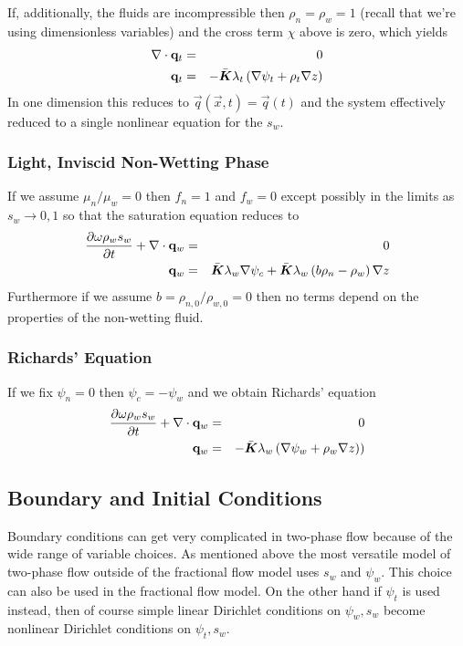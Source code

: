 \documentclass[10pt,dvips,twoside,reqno]{amsart}
\begin{document}
If, additionally, the fluids are incompressible then $\rho_n = \rho_w
= 1$ (recall that we're using dimensionless variables) and the cross term $\chi$
above is zero, which yields
\begin{eqnarray}
\nabla \cdot {\bf q}_t &=& 0 \\
{\bf q}_t  &=& - \bar{\mbox{{\boldmath ${K}$}}} \lambda_t \left( \nabla \psi_t + \rho_t \nabla z \right) 
\end{eqnarray}
In one dimension this reduces to $\vec q(\vec x,t) = \vec q(t)$ and
the system effectively reduced to a single nonlinear equation for the
$s_w$.

\subsubsection{Light, Inviscid Non-Wetting Phase}

If we assume $\mu_n / \mu_w = 0$ then $f_n = 1$ and $f_w =0$ except
possibly in the limits as $s_w \rightarrow 0,1$ so that the saturation
equation reduces to
\begin{eqnarray}
\frac{\partial {\omega \rho_w s_w}}{\partial {t}} + \nabla \cdot  {\bf q}_w  &=& 0 \\
{\bf q}_w &=& \bar{\mbox{{\boldmath ${K}$}}} \lambda_w \nabla \psi_c + \bar{\mbox{{\boldmath ${K}$}}} \lambda_w \left(  b \rho_n - \rho_w \right) \nabla z 
\end{eqnarray}
Furthermore if we assume $b = \rho_{n,0}/\rho_{w,0} = 0$ then no terms
depend on the properties of the non-wetting fluid.

\subsubsection{Richards' Equation}

If we fix $\psi_n = 0$ then $\psi_c = - \psi_w$ and we obtain
Richards' equation
\begin{eqnarray}
  \frac{\partial {\omega \rho_w s_w}}{\partial {t}} + \nabla \cdot {\bf q}_w &=& 0 \\
  {\bf q}_w &=& -\bar{\mbox{{\boldmath ${K}$}}} \lambda_w \left( \nabla \psi_w + \rho_w \nabla z
  )\right)
\end{eqnarray}

\subsection{Boundary and Initial Conditions}

Boundary conditions can get very complicated in two-phase flow because
of the wide range of variable choices. As mentioned above the most
versatile model of two-phase flow outside of the fractional flow model
uses $s_w$ and $\psi_w$. This choice can also be used in the
fractional flow model. On the other hand if $\psi_t$ is used instead,
then of course simple linear Dirichlet conditions on $\psi_w,s_w$
become nonlinear Dirichlet conditions on $\psi_t,s_w$.
\end{document}
